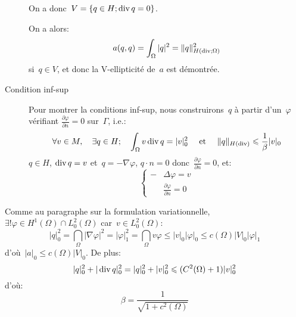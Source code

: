 \begin{description}
On a donc~$V=\left\{ q\in H; \operatorname{div} q=0\right\}$.

On a alors:
\begin{equation}a(q,q)=\displaystyle\int_\Omega |q|^2 = \|q\|^2_{H(\operatorname{div};\Omega)}\end{equation} si~$q\in V$, et
donc la V-ellipticité de~$a$ est démontrée.

\medskip
\item[Condition inf-sup]
Pour montrer la conditions inf-sup, nous construirons~$q$ à partir d'un~$\varphi$ vérifiant
$\frac{\partial\varphi}{\partial n}=0$ sur~$\Gamma$, i.e.:
\begin{equation}
\forall v\in M,\quad \exists q\in H;\quad \displaystyle\int_\Omega v \operatorname{div} q = |v|_0^2 \quad\text{ et }\quad
\|q\|_{H(\operatorname{div})}\leqslant \frac1\beta |v|_0
\end{equation}
$q\in H$, $\operatorname{div} q=v$ et~$q=-\nabla\varphi$, $q\cdot n=0$ donc~$\frac{\partial\varphi}{\partial n}=0$,
et:
\begin{equation}\left\{
\begin{aligned}
-&\Delta \varphi = v\\
&\frac{\partial \varphi}{\partial n}=0
\end{aligned}
\right.
\end{equation}
\end{description}
Comme au paragraphe sur la formulation variationnelle, $\exists!\varphi\in H^1(\Omega)\cap L^2_0(\Omega)$
car~$v\in L^2_0(\Omega)$:
\begin{equation}
|q|_0^2=\dint_\Omega |\nabla \varphi|^2 = |\varphi|_1^2 = \dint_\Omega v\varphi \le |v|_0 |\varphi|_0
\le c(\Omega) |V|_0 |\varphi|_1\end{equation} d'où~$|a|_0\le c(\Omega) |V|_0$. De plus:
\begin{equation}|q|_0^2+|\operatorname{div} q|_0^2 = |q|_0^2+|v|_0^2 \leqslant (C^2(\Omega)+1)|v|_0^2\end{equation}
d'où:
\begin{equation}\beta = \frac1{\sqrt{1+c^2(\Omega)}}\end{equation}

\medskip
{}




